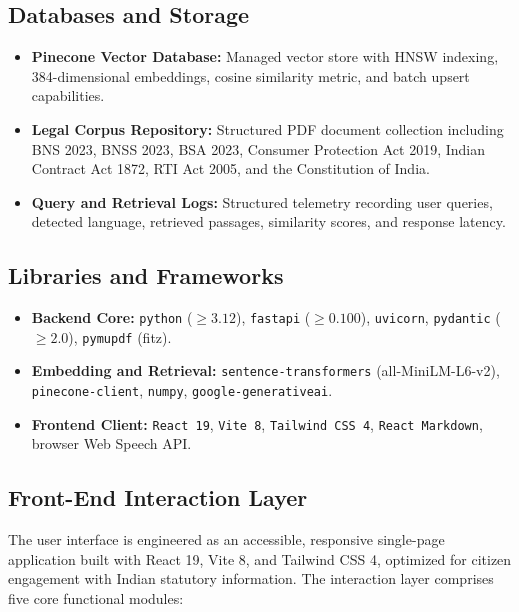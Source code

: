 \documentclass[12pt,a4paper]{report}
\begin{document}
\subsection{Databases and Storage}
\begin{itemize}
    \item \textbf{Pinecone Vector Database:} Managed vector store with HNSW indexing, 384-dimensional embeddings, cosine similarity metric, and batch upsert capabilities.
    \item \textbf{Legal Corpus Repository:} Structured PDF document collection including BNS 2023, BNSS 2023, BSA 2023, Consumer Protection Act 2019, Indian Contract Act 1872, RTI Act 2005, and the Constitution of India.
    \item \textbf{Query and Retrieval Logs:} Structured telemetry recording user queries, detected language, retrieved passages, similarity scores, and response latency.
\end{itemize}

\subsection{Libraries and Frameworks}
\begin{itemize}
    \item \textbf{Backend Core:} \texttt{python} ($\ge 3.12$), \texttt{fastapi} ($\ge 0.100$), \texttt{uvicorn}, \texttt{pydantic} ($\ge 2.0$), \texttt{pymupdf} (fitz).
    \item \textbf{Embedding and Retrieval:} \texttt{sentence-transformers} (all-MiniLM-L6-v2), \texttt{pinecone-client}, \texttt{numpy}, \texttt{google-generativeai}.
    \item \textbf{Frontend Client:} \texttt{React 19}, \texttt{Vite 8}, \texttt{Tailwind CSS 4}, \texttt{React Markdown}, browser Web Speech API.
\end{itemize}

\subsection{Front-End Interaction Layer}
The user interface is engineered as an accessible, responsive single-page application built with React 19, Vite 8, and Tailwind CSS 4, optimized for citizen engagement with Indian statutory information. The interaction layer comprises five core functional modules:
\end{document}
